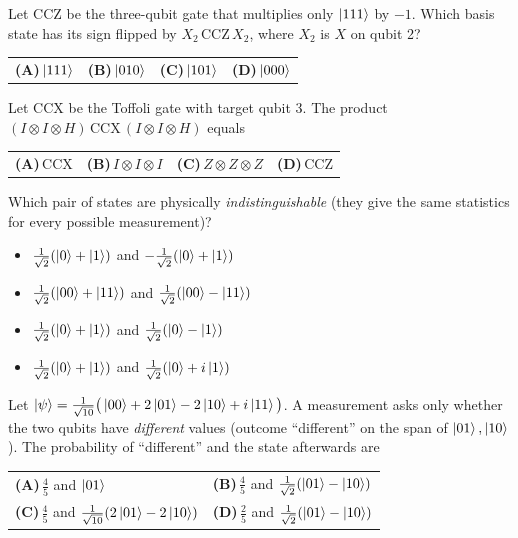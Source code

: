 \documentclass[11pt,a4paper]{article}
\newcommand{\optlabel}[1]{\textbf{(#1)}}
\newenvironment{qitem}[1]{\begin{list}{}{\setlength{\leftmargin}{3.3em}\setlength{\labelwidth}{3.1em}%
  \setlength{\labelsep}{0.2em}\setlength{\topsep}{3pt}\setlength{\parsep}{3pt}}\item[\textbf{Q.#1}\hfill]}{\end{list}}
\newcommand{\qsep}{\par\vspace{2pt}{\color{black!15}\hrule}\vspace{4pt}}
\begin{document}
\begin{qitem}{26}
Let CCZ be the three-qubit gate that multiplies only $\ket{111}$ by $-1$. Which basis state has its sign flipped by $X_2\,\mathrm{CCZ}\,X_2$, where $X_2$ is $X$ on qubit 2?
\par\smallskip\noindent\begin{tabularx}{\linewidth}{@{}*{4}{L}@{}}
\optlabel{A}\,$\ket{111}$ & \optlabel{B}\,$\ket{010}$ & \optlabel{C}\,$\ket{101}$ & \optlabel{D}\,$\ket{000}$
\end{tabularx}
\end{qitem}
\qsep

\begin{qitem}{27}
Let CCX be the Toffoli gate with target qubit 3. The product $(I \otimes I \otimes H)\,\mathrm{CCX}\,(I \otimes I \otimes H)$ equals
\par\smallskip\noindent\begin{tabularx}{\linewidth}{@{}*{4}{L}@{}}
\optlabel{A}\,CCX & \optlabel{B}\,$I \otimes I \otimes I$ & \optlabel{C}\,$Z \otimes Z \otimes Z$ & \optlabel{D}\,CCZ
\end{tabularx}
\end{qitem}
\qsep

\begin{qitem}{28}
Which pair of states are physically \emph{indistinguishable} (they give the same statistics for every possible measurement)?
\begin{itemize}[leftmargin=2.6em, labelsep=0.4em, itemsep=2pt, topsep=3pt]
\item[\optlabel{A}] $\frac{1}{\sqrt2}(\ket0 + \ket1)$ and $-\frac{1}{\sqrt2}(\ket0 + \ket1)$
\item[\optlabel{B}] $\frac{1}{\sqrt2}(\ket{00} + \ket{11})$ and $\frac{1}{\sqrt2}(\ket{00} - \ket{11})$
\item[\optlabel{C}] $\frac{1}{\sqrt2}(\ket0 + \ket1)$ and $\frac{1}{\sqrt2}(\ket0 - \ket1)$
\item[\optlabel{D}] $\frac{1}{\sqrt2}(\ket0 + \ket1)$ and $\frac{1}{\sqrt2}(\ket0 + i\ket1)$
\end{itemize}
\end{qitem}
\qsep

\begin{qitem}{29}
Let $\ket\psi = \frac{1}{\sqrt{10}}\big(\ket{00} + 2\ket{01} - 2\ket{10} + i\ket{11}\big)$. A measurement asks only whether the two qubits have \emph{different} values
(outcome ``different'' on the span of $\ket{01}, \ket{10}$). The probability of ``different'' and the state afterwards are
\par\smallskip\noindent\begin{tabularx}{\linewidth}{@{}*{2}{L}@{}}
\optlabel{A}\,$\frac45$ and $\ket{01}$ & \optlabel{B}\,$\frac45$ and $\frac{1}{\sqrt2}(\ket{01} - \ket{10})$ \\[3pt]
\optlabel{C}\,$\frac45$ and $\frac{1}{\sqrt{10}}(2\ket{01} - 2\ket{10})$ & \optlabel{D}\,$\frac25$ and $\frac{1}{\sqrt2}(\ket{01} - \ket{10})$
\end{tabularx}
\end{qitem}
\qsep
\end{document}
